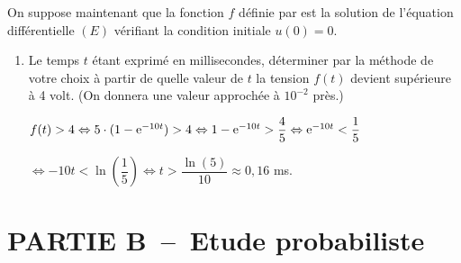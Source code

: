     \medskip

    On suppose maintenant que la fonction $f$ définie par  est la solution de l'équation différentielle $(E)$ vérifiant la condition initiale $u(0)=0$.

\begin{enumerate}[series=monDS, resume]

\item Le temps $t$ étant exprimé en millisecondes, déterminer par la méthode de votre choix à partir de quelle valeur de $t$ la tension $f(t)$ devient supérieure à 4 volt. (On donnera une valeur approchée à $10^{-2}$ près.)
\begin{blocvisiblex}[height=3]
    {\quad}
    $f(t)>4 \Leftrightarrow 5\cdot (1 - \mathrm{e}^{-10t})>4 \Leftrightarrow 1 - \mathrm{e}^{-10t}>\dfrac{4}{5} \Leftrightarrow \mathrm{e}^{-10t}<\dfrac{1}{5}$ 

    $\Leftrightarrow -10t<\ln\left(\dfrac{1}{5}\right) \Leftrightarrow t>\dfrac{\ln(5)}{10}\approx 0,16$ ms.
    \end{blocvisiblex}

    \medskip    




   \end{enumerate}


    \pagebreak

    \section*{PARTIE B~--~Etude probabiliste}

\bigskip

